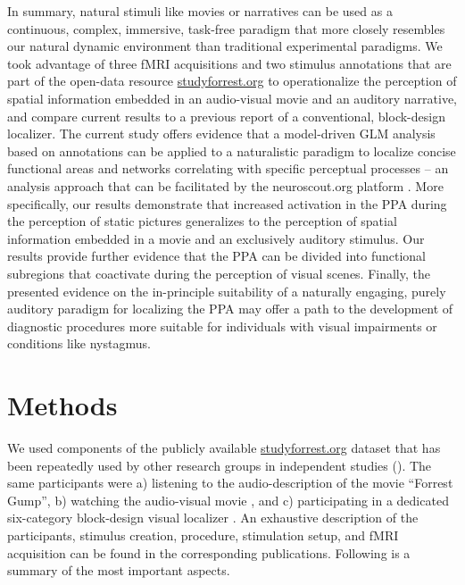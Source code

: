 \documentclass[english,11pt]{article}
\begin{document}
In summary, natural stimuli like movies \citep{eickhoff2020towards,
hasson2008neurocinematics, sonkusare2019naturalistic} or narratives
\citep{hamilton2018revolution, honey2012not, lerner2011topographic,
silbert2014coupled, wilson2008beyond} can be used as a continuous, complex,
immersive, task-free paradigm that more closely resembles our natural dynamic
environment than traditional experimental paradigms.
We took advantage of three fMRI acquisitions and two stimulus annotations that are
part of the open-data resource
\href{http://www.studyforrest.org}{studyforrest.org} to operationalize the
perception of spatial information embedded in an audio-visual movie and an
auditory narrative, and compare current results to a previous report of a
conventional, block-design localizer.
The current study offers evidence that a model-driven GLM analysis based on
annotations can be applied to a naturalistic paradigm to localize concise
functional areas and networks correlating with specific perceptual processes
-- an analysis approach that can be facilitated by the neuroscout.org platform
\citep{delavega2021neuroscout}.
More specifically, our results demonstrate that increased activation in the PPA
during the perception of static pictures generalizes to the perception of
spatial information embedded in a movie and an exclusively auditory stimulus.
Our results provide further evidence that the PPA can be divided into
functional subregions that coactivate during the perception of visual scenes.
Finally, the presented evidence on the in-principle suitability of a naturally
engaging, purely auditory paradigm for localizing the PPA may offer a path to
the development of diagnostic procedures more suitable for individuals with
visual impairments or conditions like nystagmus.


\section*{Methods}


We used components of the publicly available
\href{http://www.studyforrest.org}{studyforrest.org} dataset that has
been repeatedly used by other research groups in independent studies
(\citep[e.g.,][]{ben2018hippocampal, jiahui2019predicting, hu2017decoding,
lettieri2019emotionotopy, nguyen2016integration}).
The same participants were
a) listening to the audio-description \citep{hanke2014audiomovie} of
the movie ``Forrest Gump'',
b) watching the audio-visual movie \citep{hanke2016simultaneous}, and
c) participating in a dedicated six-category block-design visual localizer \citep{sengupta2016extension}.
An exhaustive description of the participants, stimulus creation, procedure,
stimulation setup, and fMRI acquisition can be found in the corresponding
publications. Following is a summary of the most important aspects.
\end{document}
